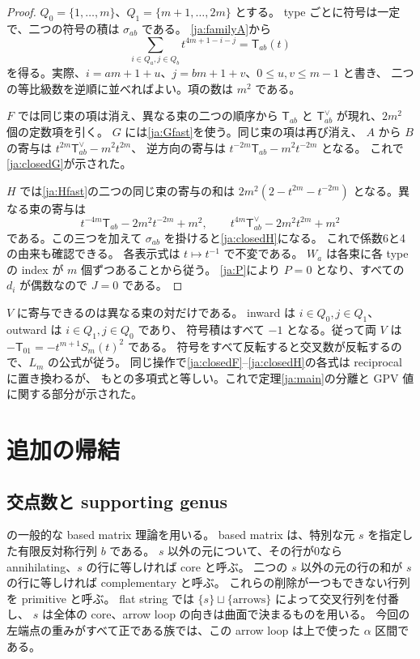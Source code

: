 \documentclass[12pt]{amsart}
\theoremstyle{definition}
\theoremstyle{remark}
\numberwithin{equation}{section}
\newcommand{\TT}{\mathsf T}
\begin{document}
\begin{proof}
$Q_0=\{1,\ldots,m\}$、$Q_1=\{m+1,\ldots,2m\}$ とする。
type ごとに符号は一定で、二つの符号の積は $\sigma_{ab}$ である。
\eqref{ja:familyA}から
\[
\sum_{i\in Q_a,j\in Q_b}t^{4m+1-i-j}=\TT_{ab}(t)
\]
を得る。実際、$i=am+1+u$、$j=bm+1+v$、$0\le u,v\le m-1$ と書き、
二つの等比級数を逆順に並べればよい。項の数は $m^2$ である。

$F$ では同じ束の項は消え、異なる束の二つの順序から
$\TT_{ab}$ と $\TT_{ab}^\vee$ が現れ、$2m^2$ 個の定数項を引く。
$G$ には\eqref{ja:Gfast}を使う。同じ束の項は再び消え、
$A$ から $B$ の寄与は $t^{2m}\TT_{ab}^\vee-m^2t^{2m}$、
逆方向の寄与は $t^{-2m}\TT_{ab}-m^2t^{-2m}$ となる。
これで\eqref{ja:closedG}が示された。

$H$ では\eqref{ja:Hfast}の二つの同じ束の寄与の和は
$2m^2(2-t^{2m}-t^{-2m})$ となる。異なる束の寄与は
\[
t^{-4m}\TT_{ab}-2m^2t^{-2m}+m^2,\qquad
t^{4m}\TT_{ab}^\vee-2m^2t^{2m}+m^2
\]
である。この三つを加えて $\sigma_{ab}$ を掛けると\eqref{ja:closedH}になる。
これで係数6と4の由来も確認できる。
各表示式は $t\mapsto t^{-1}$ で不変である。
$W_a$ は各束に各 type の index が $m$ 個ずつあることから従う。
\eqref{ja:P}により $P=0$ となり、すべての $d_i$ が偶数なので $J=0$ である。
\end{proof}

$V$ に寄与できるのは異なる束の対だけである。
inward は $i\in Q_0,j\in Q_1$、outward は $i\in Q_1,j\in Q_0$ であり、
符号積はすべて $-1$ となる。従って両 $V$ は
$-\TT_{01}=-t^{m+1}S_m(t)^2$ である。
符号をすべて反転すると交叉数が反転するので、$L_m$ の公式が従う。
同じ操作で\eqref{ja:closedF}--\eqref{ja:closedH}の各式は reciprocal に置き換わるが、
もとの多項式と等しい。これで定理\ref{ja:main}の分離と GPV 値に関する部分が示された。

\section{追加の帰結}
\subsection{交点数と supporting genus}\label{ja:genus}
\cite[Lemmas 6.1.1, 6.2.1, \S6.3]{Turaev} の一般的な based matrix 理論を用いる。
based matrix は、特別な元 $s$ を指定した有限反対称行列 $b$ である。
$s$ 以外の元について、その行が0なら annihilating、$s$ の行に等しければ core と呼ぶ。
二つの $s$ 以外の元の行の和が $s$ の行に等しければ complementary と呼ぶ。
これらの削除が一つもできない行列を primitive と呼ぶ。
flat string では $\{s\}\sqcup\{\text{arrows}\}$ によって交叉行列を付番し、
$s$ は全体の core、arrow loop の向きは曲面で決まるものを用いる。
今回の左端点の重みがすべて正である族では、この arrow loop は上で使った
$\alpha$ 区間である。
\end{document}
